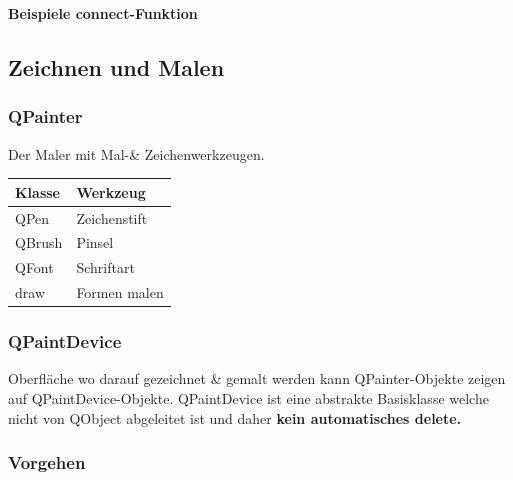 \vspace{0.5pt}
\textbf{Beispiele connect-Funktion}


\subsection{Zeichnen und Malen}
\begin{multicols}{2}
	\subsubsection{QPainter}
	Der Maler mit Mal-\& Zeichenwerkzeugen.\\
	
	\begin{tabular}{|l|l|}
		\hline \textbf{Klasse} & \textbf{Werkzeug}\\
		\hline QPen & Zeichenstift\\
		\hline QBrush & Pinsel\\
		\hline QFont & Schriftart\\
		\hline draw & Formen malen\\
		\hline
	\end{tabular}
	
	\subsubsection{QPaintDevice}
	Oberfläche wo darauf gezeichnet \& gemalt werden kann
	QPainter-Objekte zeigen auf QPaintDevice-Objekte. QPaintDevice ist eine abstrakte Basisklasse welche nicht von QObject abgeleitet ist und daher \textbf{kein automatisches delete.}\\

\end{multicols}

\subsubsection{Vorgehen}
